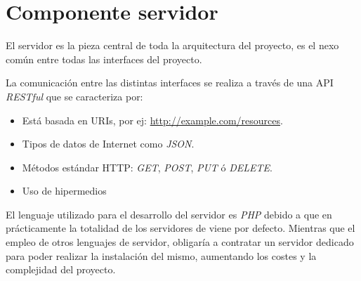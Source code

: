 \section{Componente servidor}

El servidor es la pieza central de toda la arquitectura del proyecto, es el nexo común entre todas las interfaces del proyecto.

La comunicación entre las distintas interfaces se realiza a través de una API \emph{RESTful} que se caracteriza por:

\begin{itemize}
    \item Está basada en URIs, por ej: \url{http://example.com/resources}.
    \item Tipos de datos de Internet como \emph{JSON}.
    \item Métodos estándar HTTP: \emph{GET}, \emph{POST}, \emph{PUT} ó \emph{DELETE}.
    \item Uso de hipermedios
\end{itemize}

El lenguaje utilizado para el desarrollo del servidor es \emph{PHP} debido a que en prácticamente la totalidad de los servidores de viene por defecto. Mientras que el empleo de otros lenguajes de servidor, obligaría a contratar un servidor dedicado para poder realizar la instalación del mismo, aumentando los costes y la complejidad del proyecto.